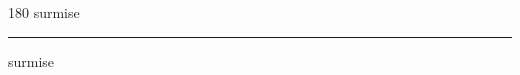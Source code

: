 
\begin{frame}
\begin{center}
\begin{turn}{180}
{\fontsize{2.5cm}{1em}\selectfont surmise}
\end{turn}
\vspace{1em}\par  
\hrule
\vspace{1em}\par  
{\fontsize{2.5cm}{1em}\selectfont surmise}
\end{center}
\end{frame}
